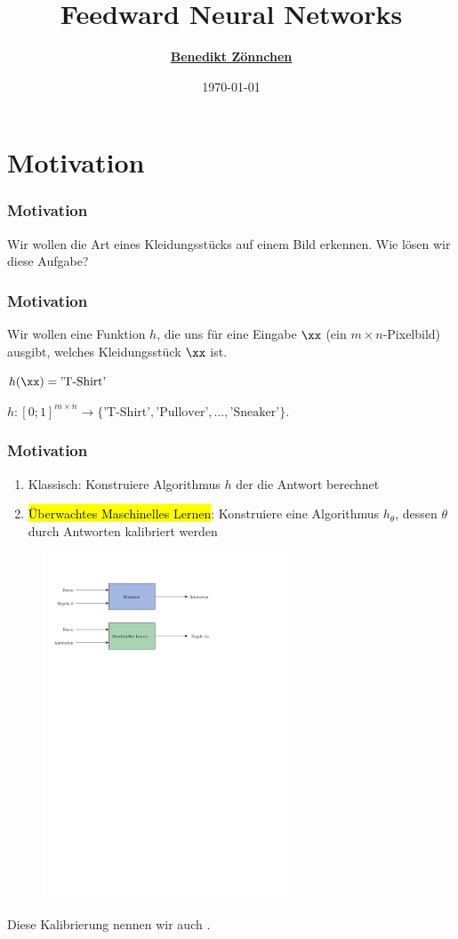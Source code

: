 \documentclass[german,aspectratio=169]{beamer}
\title{Feedward Neural Networks}
\subtitle{}
\author{\href{mailto:zoennchen.benedikt@hm.edu}{\textbf{Benedikt Z\"onnchen}}}
\date{\today}
\begin{document}
	
\begin{frame}
	\titlepage
\end{frame}

\section{Motivation}
\begin{frame}
	\frametitle{Motivation}
	\begin{Beispiel}[Problem]
		Wir wollen die Art eines Kleidungsstücks auf einem Bild erkennen. Wie lösen wir diese Aufgabe?
	\end{Beispiel}
\end{frame}

\begin{frame}
	\frametitle{Motivation}
	Wir wollen eine Funktion $h$, die uns für eine Eingabe $\xx$ (ein $m \times n$-Pixelbild) ausgibt, welches Kleidungsstück $\xx$ ist.
	\begin{center}
		$h(\xx) = \text{'T-Shirt'}$
	\end{center}
	$h : [0;1]^{m \times n} \rightarrow \{\text{'T-Shirt'}, \text{'Pullover'}, \ldots, \text{'Sneaker'} \}$.
\end{frame}


\begin{frame}
	\frametitle{Motivation}
	\begin{enumerate}[label=(\arabic*)]
		\item Klassisch: Konstruiere Algorithmus $h$ der die Antwort berechnet
		\item \hl{Überwachtes Maschinelles Lernen}: Konstruiere eine  Algorithmus $h_\theta$, dessen  $\theta$ durch Antworten kalibriert werden 	
	\end{enumerate}
	\begin{figure}
		\includegraphics[width=0.65\textwidth]{classic-vs-ml}
	\end{figure}
	Diese Kalibrierung nennen wir auch .
\end{frame}
\end{document}
